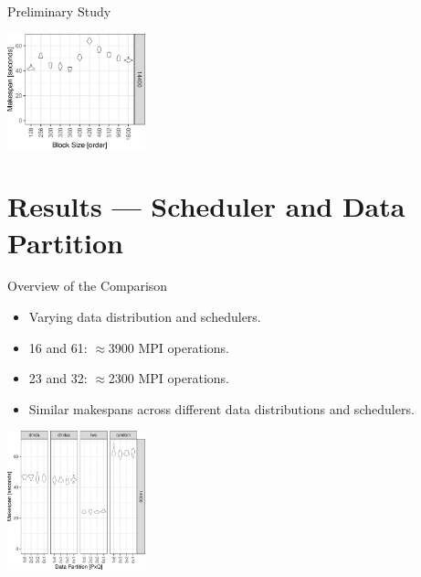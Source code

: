 \documentclass[12pt,xcolor=dvipsnames,presentation,aspectratio=169]{beamer}
\begin{document}
{\begin{frame}[label={sec:org652d67c},fragile]{Preliminary Study}
\begin{center}
\includegraphics[width=0.3\textwidth]{../img/block-size.pdf}
\end{center}
\end{frame}
\section{Results — Scheduler and Data Partition}
\label{sec:org8ce85b1}
\begin{frame}[label={sec:orgfd076bb}]{Overview of the Comparison}
\begin{itemize}
\item Varying data distribution and schedulers.
\item 1\texttimes{}6 and 6\texttimes{}1: \(\approx\)3900 MPI operations.
\item 2\texttimes{}3 and 3\texttimes{}2: \(\approx\)2300 MPI operations.
\item Similar makespans across different data distributions and schedulers.
\end{itemize}

\begin{center}
\includegraphics[width=0.3\textwidth]{../img/distrib-scheduler.pdf}
\end{center}
\end{frame}
}
\end{document}
